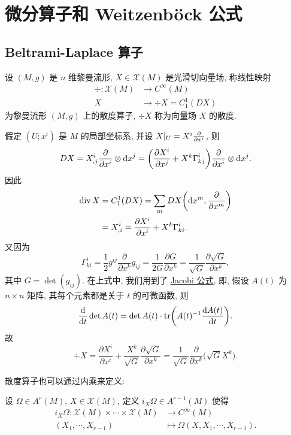 \setcounter{chapter}{3}
\chapter{微分算子和 Weitzenb\"ock 公式}



\section{Beltrami-Laplace 算子}



\begin{definition}
  设 $(M,g)$ 是 $n$ 维黎曼流形, $X\in\mathscr{X}(M)$ 是光滑切向量场, 称线性映射
  \begin{align*}
    \div\colon\mathscr{X}(M) & \longrightarrow C^{\infty}(M) \\
    X & \longrightarrow \div X = C_1^1(DX)
  \end{align*}
  为黎曼流形 $(M,g)$ 上的散度算子, $\div X$ 称为向量场 $X$ 的散度.
\end{definition}

假定 $(U;x^i)$ 是 $M$ 的局部坐标系, 并设 $X|_U=X^i\pdv{x^i}$, 则
\[DX = X^i_{,j}\pdv{x^i}\otimes \mathop{}\!\mathrm{d} x^j 
  = \biggl(\frac{\partial X^i}{\partial x^j}+X^k\Gamma^i_{kj}\biggr)\pdv{x^i}\otimes \mathop{}\!\mathrm{d} x^j.\]
因此
\begin{align*}
  \operatorname{div} X
  & = C_1^1(DX) = \sum_m DX\biggl(\mathop{}\!\mathrm{d} x^m,\pdv{x^m}\biggr) \\
  & = X_{,i}^i = \frac{\partial X^i}{\partial x^i}+X^k\Gamma_{ki}^i.
\end{align*}
又因为
\[\Gamma^i_{ki} = \frac{1}{2}g^{ij}\frac{\partial}{\partial x^k}g_{ij}
  = \frac{1}{2G}\frac{\partial G}{\partial x^k} 
  = \frac{1}{\sqrt{G}}\frac{\partial\sqrt{G}}{\partial x^k},\]
其中 $G=\det(g_{ij})$. 在上式中, 我们用到了 
\href{https://en.wikipedia.org/wiki/Jacobi%27s_formula}{Jacobi 公式}, 即, 假设 $A(t)$
为 $n\times n$ 矩阵, 其每个元素都是关于 $t$ 的可微函数, 则
\[\frac{\mathop{}\!\mathrm{d}}{\mathop{}\!\mathrm{d} t}\det A(t) 
  = \det A(t)\cdot\tr\biggl(A(t)^{-1}\frac{\mathop{}\!\mathrm{d} A(t)}{\mathop{}\!\mathrm{d} t}\biggr).\]
故
\[\div X = \frac{\partial X^i}{\partial x^i}
  + \frac{X^k}{\sqrt{G}}\frac{\partial\sqrt{G}}{\partial x^k}
  = \frac{1}{\sqrt{G}}\frac{\partial}{\partial x^k}\bigl(\sqrt{G}X^k\bigr).\]

散度算子也可以通过内乘来定义:

设 $\Omega\in A^r(M)$, $X\in\mathscr{X}(M)$, 定义 $i_X\Omega\in A^{r-1}(M)$ 使得
\begin{align*}
  i_X\Omega\colon \mathscr{X}(M)\times\cdots\times\mathscr{X}(M)
  & \longrightarrow C^{\infty}(M) \\
  (X_1,\cdots,X_{r-1}) & \longmapsto \Omega(X,X_1,\cdots,X_{r-1}).
\end{align*}



